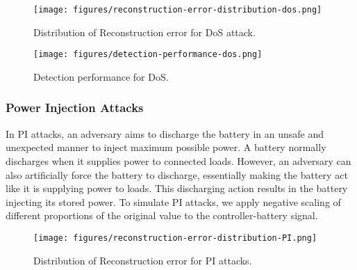\begin{figure}[htbp!] 
    \centering 
    \texttt{[image: figures/reconstruction-error-distribution-dos.png]}
    \caption{Distribution of Reconstruction error for DoS attack.}
    \centering
    \label{fig:dos1}
\end{figure}


\begin{figure}[htbp!] 
    \centering 
    \texttt{[image: figures/detection-performance-dos.png]}
    \caption{Detection performance for DoS.}
    \centering
    \label{fig:dos2}
\end{figure}


\iffalse
\begin{figure}[htbp!] 
    \centering 
    \texttt{[image: figures/confusion\_matrix\_DoS.png]}
    \caption{Confusion matrix DoS}
    \centering
    \labeld{dos3}
\end{figure}
\fi

\subsubsection{Power Injection Attacks}


In PI attacks, an adversary aims to discharge the battery in an unsafe and unexpected manner to inject maximum possible power. A battery normally discharges when it supplies power to connected loads. However, an adversary can also artificially force the battery to discharge, essentially making the battery act like it is supplying power to loads. This discharging action results in the battery injecting its stored power. To simulate PI attacks, we apply negative scaling of different proportions of the original value to the controller-battery signal. 

\begin{figure}[htbp!] 
    \centering 
    \texttt{[image: figures/reconstruction-error-distribution-PI.png]}
    \caption{Distribution of Reconstruction error for PI attacks.}
    \centering
    \label{fig:PI1}
\end{figure}


